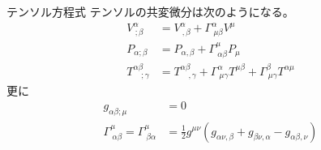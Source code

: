 \documentclass[uplatex,dvipdfmx,a4paper,11pt]{jlreq}
\theoremstyle{definition}
\begin{document}
\begin{itembox}[l]{テンソル方程式}
  テンソルの共変微分は次のようになる。
  \begin{align}
    V^\alpha_{\ ;\beta}            & = V^\alpha_{\ ,\beta} + \Gamma^\alpha_{\ \mu\beta}V^\mu                                                              \\
    P_{\alpha;\beta}               & = P_{\alpha,\beta} + \Gamma^\mu_{\ \alpha\beta}P_\mu                                                                 \\
    T^{\alpha\beta}_{\quad;\gamma} & = T^{\alpha\beta}_{\quad,\gamma} + \Gamma^\alpha_{\ \mu\gamma}T^{\mu\beta} + \Gamma^\beta_{\ \mu\gamma}T^{\alpha\mu}
  \end{align}
  更に
  \begin{align}
    g_{\alpha\beta;\mu}                                     & = 0                                                                                      \\
    \Gamma^\mu_{\ \alpha\beta} = \Gamma^\mu_{\ \beta\alpha} & = \frac{1}{2}g^{\mu\nu}(g_{\alpha\nu,\beta} + g_{\beta\nu,\alpha} - g_{\alpha\beta,\nu})
  \end{align}
\end{itembox}
\end{document}
